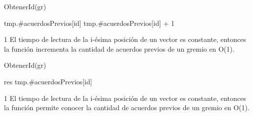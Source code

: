 {
	\state {} \asig ObtenerId(gr)											

	\state tmp.\#acuerdosPrevios[id] \asig tmp.\#acuerdosPrevios[id] + 1					
}
{1}
{ El tiempo de lectura de la i-\'esima posici\'on de un vector es constante, entonces la funci\'on incrementa la cantidad de acuerdos previos de un gremio en O(1). }

{
	\state {} \asig ObtenerId(gr)			

	\state res \asig tmp.\#acuerdosPrevios[id]					
}
{1}
{ El tiempo de lectura de la i-\'esima posici\'on de un vector es constante, entonces la funci\'on permite conocer la cantidad de acuerdos previos de un gremio en O(1). }